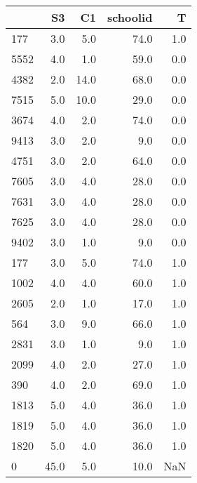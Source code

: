 \begin{tabular}{lrrrr}
\toprule
{} &    S3 &    C1 &  schoolid &    T \\
\midrule
177  &   3.0 &   5.0 &      74.0 &  1.0 \\
5552 &   4.0 &   1.0 &      59.0 &  0.0 \\
4382 &   2.0 &  14.0 &      68.0 &  0.0 \\
7515 &   5.0 &  10.0 &      29.0 &  0.0 \\
3674 &   4.0 &   2.0 &      74.0 &  0.0 \\
9413 &   3.0 &   2.0 &       9.0 &  0.0 \\
4751 &   3.0 &   2.0 &      64.0 &  0.0 \\
7605 &   3.0 &   4.0 &      28.0 &  0.0 \\
7631 &   3.0 &   4.0 &      28.0 &  0.0 \\
7625 &   3.0 &   4.0 &      28.0 &  0.0 \\
9402 &   3.0 &   1.0 &       9.0 &  0.0 \\
177  &   3.0 &   5.0 &      74.0 &  1.0 \\
1002 &   4.0 &   4.0 &      60.0 &  1.0 \\
2605 &   2.0 &   1.0 &      17.0 &  1.0 \\
564  &   3.0 &   9.0 &      66.0 &  1.0 \\
2831 &   3.0 &   1.0 &       9.0 &  1.0 \\
2099 &   4.0 &   2.0 &      27.0 &  1.0 \\
390  &   4.0 &   2.0 &      69.0 &  1.0 \\
1813 &   5.0 &   4.0 &      36.0 &  1.0 \\
1819 &   5.0 &   4.0 &      36.0 &  1.0 \\
1820 &   5.0 &   4.0 &      36.0 &  1.0 \\
0    &  45.0 &   5.0 &      10.0 &  NaN \\
\bottomrule
\end{tabular}
